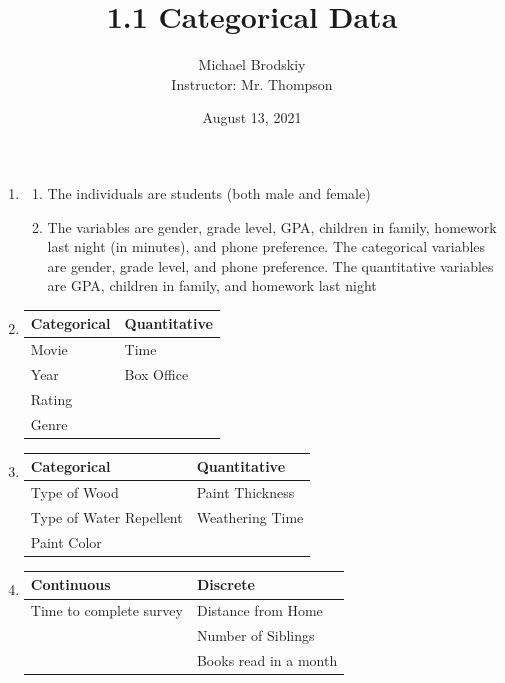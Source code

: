 \documentclass[12pt]{article}
\title{1.1 Categorical Data}
\date{August 13, 2021}
\author{Michael Brodskiy\\ \small Instructor: Mr. Thompson}
\begin{document}
\maketitle

\begin{enumerate}

  \item 

    \begin{enumerate}

      \item The individuals are students (both male and female)

      \item The variables are gender, grade level, GPA, children in family, homework last night (in minutes), and phone preference. The categorical variables are gender, grade level, and phone preference. The quantitative variables are GPA, children in family, and homework last night

    \end{enumerate}

    \setcounter{enumi}{2}

  \item \begin{tabular}{| l | l |} \hline Categorical & Quantitative\\ \hline Movie & Time\\ \hline Year & Box Office\\ \hline Rating  & \\ \hline Genre & \\ \hline   \end{tabular}

    \setcounter{enumi}{4}

  \item \begin{tabular}{| l | l |} \hline Categorical & Quantitative\\ \hline Type of Wood & Paint Thickness\\ \hline Type of Water Repellent & Weathering Time\\ \hline Paint Color & \\ \hline \end{tabular}

    \setcounter{enumi}{6}

  \item \begin{tabular}{| l | l |} \hline Continuous & Discrete\\ \hline Time to complete survey  & Distance from Home\\ \hline & Number of Siblings\\ \hline & Books read in a month \\ \hline \end{tabular}


\end{enumerate}
\end{document}
